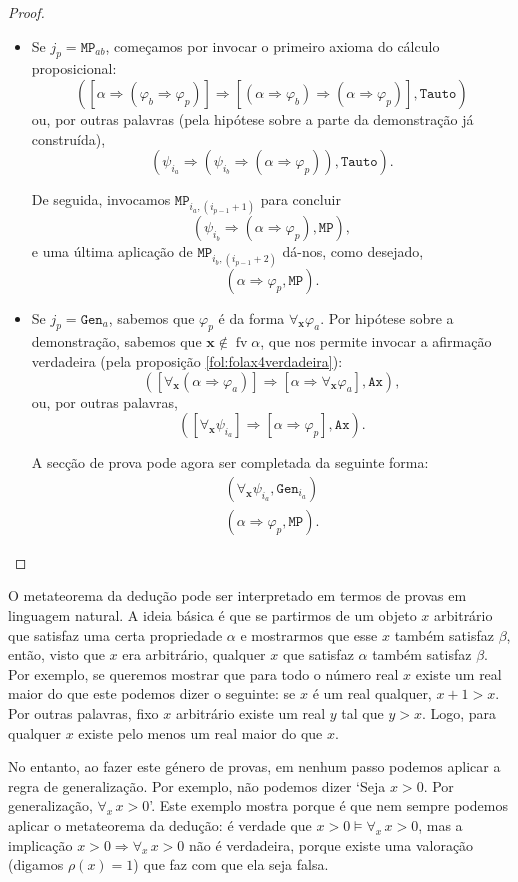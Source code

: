 \documentclass{report}
\theoremstyle{definition}
\theoremstyle{remark}
\renewcommand{\bf}[1]{\mathbf{#1}}
\DeclareMathOperator{\fv}{fv}
\newcommand{\imply}{\mathbin{\Rightarrow}}
\begin{document}
\begin{proof}
\begin{itemize}
	\item Se $j_p = \mathtt{MP}_{ab}$, começamos por invocar o primeiro axioma do cálculo proposicional:
	\[([\alpha \imply (\varphi_b \imply \varphi_p)] \imply [(\alpha \imply \varphi_b) \imply (\alpha \imply \varphi_p)], \texttt{Tauto})\]
	ou, por outras palavras (pela hipótese sobre a parte da demonstração já construída),
	\[(\psi_{i_a} \imply (\psi_{i_b} \imply (\alpha \imply \varphi_p)), \texttt{Tauto}).\]
	
	De seguida, invocamos $\mathtt{MP}_{i_a, (i_{p-1}+1)}$ para concluir
	\[(\psi_{i_b} \imply (\alpha \imply \varphi_p), \texttt{MP}),\]
	e uma última aplicação de $\mathtt{MP}_{i_b, (i_{p-1}+2)}$ dá-nos, como desejado,
	\[(\alpha \imply \varphi_p, \texttt{MP}).\]
	
	\item Se $j_p = \mathtt{Gen}_a$, sabemos que $\varphi_p$ é da forma $\forall_{\bf x} \varphi_a$. Por hipótese sobre a demonstração, sabemos que $\bf x \not \in \fv \alpha$, que nos permite invocar a afirmação verdadeira (pela proposição \ref{fol:folax4verdadeira}):
	\[([\forall_{\bf x} (\alpha \imply \varphi_a)] \imply [\alpha \imply \forall_{\bf x} \varphi_a], \mathtt{Ax}),\]
	ou, por outras palavras,
	\[([\forall_{\bf x} \psi_{i_a}] \imply [\alpha \imply \varphi_p], \mathtt{Ax}).\]
	
	A secção de prova pode agora ser completada da seguinte forma:
	\begin{gather*}
	(\forall_{\bf x} \psi_{i_a}, \mathtt{Gen}_{i_a})\\
	(\alpha \imply \varphi_p, \mathtt{MP}).
	\end{gather*}
	\end{itemize}
	\end{proof}
	
	O metateorema da dedução pode ser interpretado em termos de provas em linguagem natural. A ideia básica é que se partirmos de um objeto $x$ arbitrário que satisfaz uma certa propriedade $\alpha$ e mostrarmos que esse $x$ também satisfaz $\beta$, então, visto que $x$ era arbitrário, qualquer $x$ que satisfaz $\alpha$ também satisfaz $\beta$. Por exemplo, se queremos mostrar que para todo o número real $x$ existe um real maior do que este podemos dizer o seguinte: se $x$ é um real qualquer, $x+1>x$. Por outras palavras, fixo $x$ arbitrário existe um real $y$ tal que $y > x$. Logo, para qualquer $x$ existe pelo menos um real maior do que $x$.

	No entanto, ao fazer este género de provas, em nenhum passo podemos aplicar a regra de generalização. Por exemplo, não podemos dizer `Seja $x > 0$. Por generalização, $\forall_x \, x>0$'. Este exemplo mostra porque é que nem sempre podemos aplicar o metateorema da dedução: é verdade que $x > 0 \vDash \forall_x\, x>0$, mas a implicação $x > 0 \imply \forall_x \, x > 0$ não é verdadeira, porque existe uma valoração (digamos $\rho(x) = 1$) que faz com que ela seja falsa.
	
\end{document}
